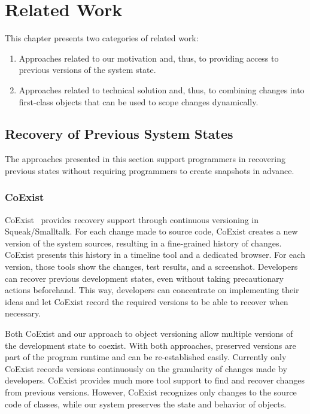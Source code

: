 \chapter{Related Work} \label{chapter:RELATED_WORK}

This chapter presents two categories of related work:

\begin{enumerate}
    \item Approaches related to our motivation and, thus, to providing access to previous versions of the system state.
    \item Approaches related to technical solution and, thus, to combining changes into first-class objects that can be used to scope changes dynamically.
\end{enumerate}


\section{Recovery of Previous System States}

The approaches presented in this section support programmers in recovering previous states without requiring programmers to create snapshots in advance.


\subsection{CoExist}

CoExist~\cite{Steinert2012COE} provides recovery support through continuous versioning in Squeak/Smalltalk.
For each change made to source code, CoExist creates a new version of the system sources, resulting in a fine-grained history of changes.
CoExist presents this history in a timeline tool and a dedicated browser.
For each version, those tools show the changes, test results, and a screenshot.
Developers can recover previous development states, even without taking precautionary actions beforehand.
This way, developers can concentrate on implementing their ideas and let CoExist record the required versions to be able to recover when necessary.

Both CoExist and our approach to object versioning allow multiple versions of the development state to coexist.
With both approaches, preserved versions are part of the program runtime and can be re-established easily.
Currently only CoExist records versions continuously on the granularity of changes made by developers.
CoExist provides much more tool support to find and recover changes from previous versions.
However, CoExist recognizes only changes to the source code of classes, while our system preserves the state and behavior of objects.


